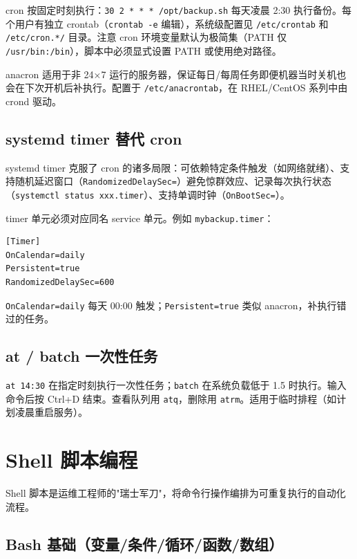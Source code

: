 \documentclass[12pt,UTF8]{ctexbook}
\begin{document}
cron 按固定时刻执行：\verb|30 2 * * * /opt/backup.sh| 每天凌晨 2:30 执行备份。每个用户有独立 crontab（\verb|crontab -e| 编辑），系统级配置见 \verb|/etc/crontab| 和 \verb|/etc/cron.*/| 目录。注意 cron 环境变量默认为极简集（PATH 仅 \verb|/usr/bin:/bin|），脚本中必须显式设置 PATH 或使用绝对路径。

anacron 适用于非 24×7 运行的服务器，保证每日/每周任务即便机器当时关机也会在下次开机后补执行。配置于 \verb|/etc/anacrontab|，在 RHEL/CentOS 系列中由 crond 驱动。

    \subsection{systemd timer 替代 cron}

systemd timer 克服了 cron 的诸多局限：可依赖特定条件触发（如网络就绪）、支持随机延迟窗口（\verb|RandomizedDelaySec=|）避免惊群效应、记录每次执行状态（\verb|systemctl status xxx.timer|）、支持单调时钟（\verb|OnBootSec=|）。

timer 单元必须对应同名 service 单元。例如 \verb|mybackup.timer|：
\begin{verbatim}
[Timer]
OnCalendar=daily
Persistent=true
RandomizedDelaySec=600
\end{verbatim}
\verb|OnCalendar=daily| 每天 00:00 触发；\verb|Persistent=true| 类似 anacron，补执行错过的任务。

    \subsection{at / batch 一次性任务}

\verb|at 14:30| 在指定时刻执行一次性任务；\verb|batch| 在系统负载低于 1.5 时执行。输入命令后按 Ctrl+D 结束。查看队列用 \verb|atq|，删除用 \verb|atrm|。适用于临时排程（如计划凌晨重启服务）。

  \section{Shell 脚本编程}

Shell 脚本是运维工程师的"瑞士军刀"，将命令行操作编排为可重复执行的自动化流程。

    \subsection{Bash 基础（变量/条件/循环/函数/数组）}
\end{document}
